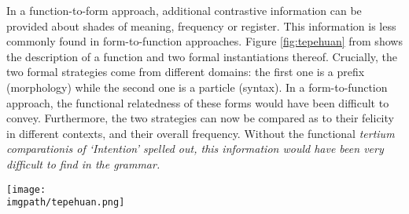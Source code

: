 In a function-to-form approach, additional contrastive information can be provided about shades of meaning, frequency or register. This information is less commonly found in form-to-function approaches. Figure \ref{fig:tepehuan} from \citet{Willett1991} shows the description of a function and two formal instantiations thereof. Crucially, the two formal strategies come from different domains: the first one is a prefix (morphology) while the second one is a particle (syntax). In a form-to-function approach, the functional relatedness of these forms would have been difficult to convey. Furthermore, the two strategies can now be compared as to their felicity in different contexts, and their overall frequency. Without the functional \em tertium comparationis \em of `Intention' spelled out, this information would have been very difficult to find in the grammar.

\begin{sidewaysfigure}
 \centering
 \texttt{[image: \\imgpath/tepehuan.png]} 
 \caption{A function-to-form description of `Intention' in Tepehuan \citep{Willett1991}.}
 \label{fig:tepehuan}
\end{sidewaysfigure}



